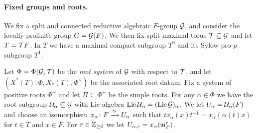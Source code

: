 \paragraph{Fixed groups and roots.} We fix a split and connected reductive algebraic $F$-group $\mathcal{G}$, and consider the locally profinite group $G = \mathcal{G}(F)$. We then fix split maximal torus $\mathcal{T} \subseteq \mathcal{G}$ and let $T = \mathcal{T}{F}$. In $T$ we have a maximal compact subgroup $T^{0}$ and its Sylow pro-$p$ subgroup $T^{1}$.

Let $\Phi = \Phi(\mathcal{G},\mathcal{T})$ be the \emph{root system} of $\mathcal{G}$ with respect to $\mathcal{T}$, and let $(X^{*}(T),\Phi,X_{*}(T),\Phi^{\vee})$ be the associated root datum. Fix a system of positive roots $\Phi^{+}$ and let $\Pi \subseteq \Phi^{+}$ be the simple roots. For any $\alpha \in \Phi$ we have the root subgroup $\mathcal{U}_{\alpha} \subseteq \mathcal{G}$ with Lie algebra $\operatorname{Lie} \mathcal{U}_{\alpha} =  (\operatorname{Lie} \mathcal{G})_{\alpha}$. We let $U_{\alpha} = \mathcal{U}_{\alpha}(F)$ and choose an isomorphism $x_{\alpha} \colon F \xrightarrow{\cong} U_{\alpha}$ such that $tx_{\alpha}(x)t^{-1} = x_{\alpha}(\alpha(t)x)$ for $t \in T$ and $x \in F$. For $r \in \mathbb{Z}_{\geq 0}$ we let $U_{\alpha,r} = x_{\alpha}(\mathfrak{m}_{F}^{r})$.



